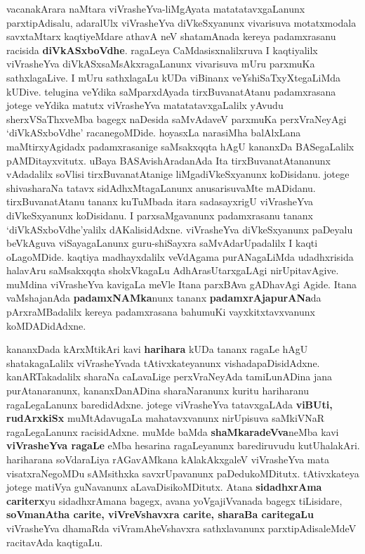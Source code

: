 vacanakArara naMtara viVrasheYva-liMgAyata matatatavxgaLanunx parxtipAdisalu, adaralUlx viVrasheYva diVkeSxyanunx vivarisuva motatxmodala savxtaMtarx kaqtiyeMdare  athavA neV shatamAnada kereya padamxrasanu racisida \textbf{diVkASxboVdhe}. ragaLeya CaMdasisxnalilxruva I kaqtiyalilx viVrasheYva diVkASxsaMsAkxragaLanunx vivarisuva mUru parxmuKa sathxlagaLive. I mUru sathxlagaLu kUDa viBinanx veYshiSaTxyXtegaLiMda kUDive. telugina veYdika saMparxdAyada tirxBuvanatAtanu padamxrasana jotege veYdika matutx viVrasheYva matatatavxgaLalilx yAvudu sherxVSaThxveMba bagegx naDesida saMvAdaveV parxmuKa perxVraNeyAgi `diVkASxboVdhe' racanegoMDide. hoyasxLa narasiMha balAlxLana maMtirxyAgidadx padamxrasanige saMsakxqqta hAgU kananxDa BASegaLalilx pAMDitayxvitutx. uBaya BASAvishAradanAda Ita tirxBuvanatAtananunx vAdadalilx soVlisi tirxBuvanatAtanige liMgadiVkeSxyanunx koDisidanu. jotege shivasharaNa tatavx sidAdhxMtagaLanunx anusarisuvaMte mADidanu. tirxBuvanatAtanu tananx kuTuMbada itara sadasayxrigU viVrasheYva diVkeSxyanunx koDisidanu. I parxsaMgavanunx padamxrasanu tananx `diVkASxboVdhe'yalilx dAKalisidAdxne. viVrasheYva diVkeSxyanunx paDeyalu beVkAguva viSayagaLanunx guru-shiSayxra saMvAdarUpadalilx I kaqti oLagoMDide. kaqtiya madhayxdalilx veVdAgama purANagaLiMda udadhxrisida halavAru saMsakxqqta sholxVkagaLu AdhArasUtarxgaLAgi nirUpitavAgive. muMdina viVrasheYva kavigaLa meVle Itana parxBAva gADhavAgi Agide.  Itana vaMshajanAda \textbf{padamxNAMka}nunx tananx \textbf{padamxrAjapurANa}da pArxraMBadalilx kereya padamxrasana bahumuKi vayxkitxtavxvanunx koMDADidAdxne.

kananxDada kArxMtikAri kavi \textbf{harihara} kUDa tananx ragaLe hAgU shatakagaLalilx viVrasheYvada tAtivxkateyanunx vishadapaDisidAdxne. kanARTakadalilx sharaNa caLavaLige perxVraNeyAda tamiLunADina  jana purAtanaranunx, kananxDanADina sharaNaranunx kuritu hariharanu ragaLegaLanunx baredidAdxne. jotege viVrasheYva tatavxgaLAda \textbf{viBUti, rudArxkiSx} muMtAdavugaLa mahatavxvanunx nirUpisuva saMkiVNaR ragaLegaLanunx racisidAdxne. muMde baMda \textbf{shaMkaradeVva}neMba kavi \textbf{viVrasheYva ragaLe} eMba hesarina ragaLeyanunx barediruvudu kutUhalakAri. hariharana soVda\-raLiya rAGavAMkana kAlakAkxgaleV viVrasheYva mata visatxraNegoMDu sAMsithxka savxrUpavanunx paDedukoMDitutx. tAtivxkateya jotege matiVya guNavanunx aLavaDisikoMDitutx. Atana \textbf{sidadhxrAma cariterx}yu sidadhxrAmana bagegx, avana yoVgajiVvanada bagegx tiLisidare, \textbf{soVmanAtha carite, viVreVshavxra carite, sharaBa caritegaLu} viVrasheYva dhamaRda viVramAheVshavxra sathxlavanunx parxtipAdisaleMdeV racitavAda kaqtigaLu.

